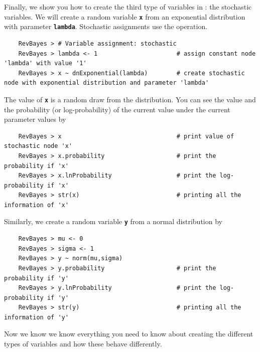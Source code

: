 \documentclass[11pt]{article}
\newcommand{\cl}[1]{{\texttt{\textbf{#1}}}}
\newcommand{\rbdn}{{\Large \symbol{126}}} %
\begin{document}
Finally, we show you how to create the third type of variables in \Rev: the stochastic variables. 
We will create a random variable \cl{x} from an exponential distribution with parameter \cl{lambda}.  
Stochastic assignments use the \cl{\rbdn} operation.
{\tt \begin{snugshade*}
\begin{lstlisting}    
    RevBayes > # Variable assignment: stochastic
    RevBayes > lambda <- 1                      # assign constant node 'lambda' with value '1'
    RevBayes > x ~ dnExponential(lambda)        # create stochastic node with exponential distribution and parameter 'lambda'
\end{lstlisting}
\end{snugshade*}}
The value of \cl{x} is a random draw from the distribution. 
You can see the value and the probability (or log-probability) of the current value under the current parameter values by
{\tt \begin{snugshade*}
\begin{lstlisting}    
    RevBayes > x                                # print value of stochastic node 'x'
    RevBayes > x.probability                    # print the probability if 'x'
    RevBayes > x.lnProbability                  # print the log-probability if 'x'
    RevBayes > str(x)                           # printing all the information of 'x'
\end{lstlisting}
\end{snugshade*}}
Similarly, we create a random variable \cl{y} from a normal distribution by
{\tt \begin{snugshade*}
\begin{lstlisting}    
    RevBayes > mu <- 0
    RevBayes > sigma <- 1
    RevBayes > y ~ norm(mu,sigma)	
    RevBayes > y.probability                    # print the probability if 'y'
    RevBayes > y.lnProbability                  # print the log-probability if 'y'
    RevBayes > str(y)                           # printing all the information of 'y'
\end{lstlisting}
\end{snugshade*}}
Now we know we know everything you need to know about creating the different types of variables and how these behave differently.
\end{document}
